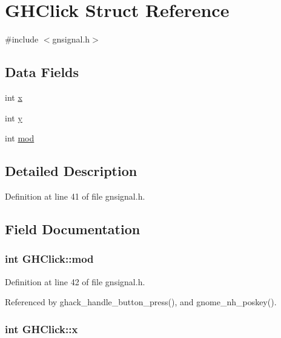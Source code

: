 \hypertarget{structGHClick}{\section{G\+H\+Click Struct Reference}
\label{structGHClick}
}


{\ttfamily \#include $<$gnsignal.\+h$>$}

\subsection*{Data Fields}
\begin{DoxyCompactItemize}
\item 
int \hyperlink{structGHClick_ad7461ee00ed3a2f04603eef7429d10f9}{x}
\item 
int \hyperlink{structGHClick_a5d3940337259fe197aa857bf98fb09cb}{y}
\item 
int \hyperlink{structGHClick_a46d19be2dfbee76bc7b756be116e0d17}{mod}
\end{DoxyCompactItemize}


\subsection{Detailed Description}


Definition at line 41 of file gnsignal.\+h.



\subsection{Field Documentation}
\hypertarget{structGHClick_a46d19be2dfbee76bc7b756be116e0d17}{
\subsubsection[{mod}]{\setlength{\rightskip}{0pt plus 5cm}int G\+H\+Click\+::mod}}\label{structGHClick_a46d19be2dfbee76bc7b756be116e0d17}


Definition at line 42 of file gnsignal.\+h.



Referenced by ghack\+\_\+handle\+\_\+button\+\_\+press(), and gnome\+\_\+nh\+\_\+poskey().

\hypertarget{structGHClick_ad7461ee00ed3a2f04603eef7429d10f9}{
\subsubsection[{x}]{\setlength{\rightskip}{0pt plus 5cm}int G\+H\+Click\+::x}}\label{structGHClick_ad7461ee00ed3a2f04603eef7429d10f9}



